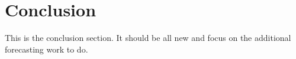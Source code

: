 \section{Conclusion}
\label{sec:conclusion}

This is the conclusion section. It should be all new and focus on the additional forecasting work to do.